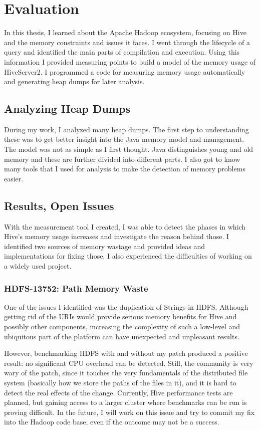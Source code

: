 \chapter{Evaluation}
In this thesis, I learned about the Apache Hadoop ecosystem, focusing on Hive and the memory constraints and issues it faces. I went through the lifecycle of a query and identified the main parts of compilation and execution. Using this information I provided measuring points to build a model of the memory usage of HiveServer2. I programmed a code for measuring memory usage automatically and generating heap dumps for later analysis.

\section{Analyzing Heap Dumps}
During my work, I analyzed many heap dumps. The first step to understanding these was to get better insight into the Java memory model and management. The model was not as simple as I first thought. Java distinguishes young and old memory and these are further divided into different parts. I also got to know many tools that I used for analysis to make the detection of memory problems easier. 

\section{Results, Open Issues}
With the measurement tool I created, I was able to detect the phases in which Hive's memory usage increases and investigate the reason behind those. I identified two sources of memory wastage and provided ideas and implementations for fixing those. I also experienced the difficulties of working on a widely used project.

\subsection{HDFS-13752: Path Memory Waste}
One of the issues I identified was the duplication of Strings in HDFS. Although getting rid of the URIs would provide serious memory benefits for Hive and possibly other components, increasing the complexity of such a low-level and ubiquitous part of the platform can have unexpected and unpleasant results. 

However, benchmarking HDFS with and without my patch produced a positive result: no significant CPU overhead can be detected. Still, the community is very wary of the patch, since it touches the very fundamentals of the distributed file system (basically how we store the paths of the files in it), and it is hard to detect the real effects of the change. Currently, Hive performance tests are planned, but gaining access to a larger cluster where benchmarks can be run is proving difficult. In the future, I will work on this issue and try to commit my fix into the Hadoop code base, even if the outcome may not be a success.

